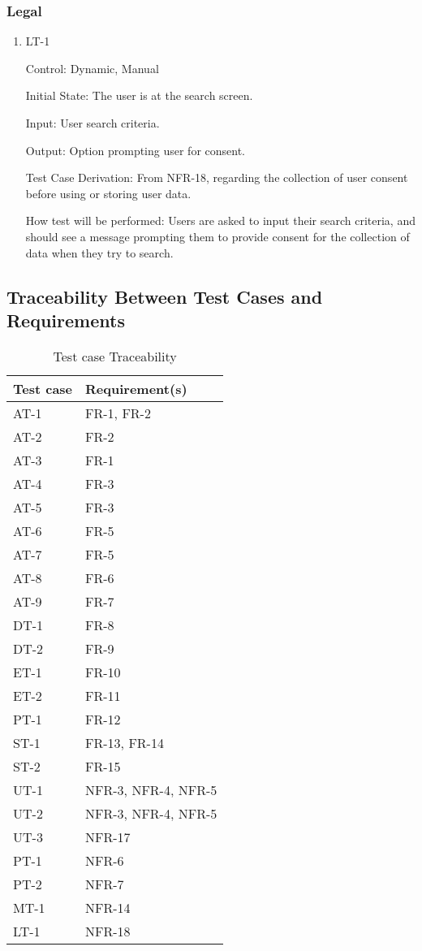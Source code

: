 \documentclass[12pt, titlepage]{article}
\begin{document}
\subsubsection{Legal}

\begin{enumerate}
\item{LT-1}

Control: Dynamic, Manual
					
Initial State: The user is at the search screen.

Input: User search criteria.

Output: Option prompting user for consent.

Test Case Derivation: From NFR-18, regarding the collection of user consent before using or storing user data.

How test will be performed: Users are asked to input their search criteria, and should see a message prompting them to provide consent for the collection of data when they try to search.

\end{enumerate}

\subsection{Traceability Between Test Cases and Requirements}

\begin{table}[H]
  \caption{Test case Traceability}
  \begin{tabular}{|p{7cm}|p{7cm}|}
  \hline
  Test case & Requirement(s)\\
  \hline
  AT-1 & FR-1, FR-2\\
  \hline
  AT-2 & FR-2\\
  \hline
  AT-3 & FR-1\\
  \hline
  AT-4 & FR-3\\
  \hline
  AT-5 & FR-3\\
  \hline
  AT-6 & FR-5\\
  \hline
  AT-7 & FR-5\\
  \hline
  AT-8 & FR-6\\
  \hline
  AT-9 & FR-7\\
  \hline
  DT-1 & FR-8\\
  \hline
  DT-2 & FR-9\\
  \hline
  ET-1 & FR-10\\
  \hline
  ET-2 & FR-11\\
  \hline
  PT-1 & FR-12\\
  \hline
  ST-1 & FR-13, FR-14\\
  \hline
  ST-2 & FR-15\\
  \hline
  UT-1 & NFR-3, NFR-4, NFR-5\\
  \hline
  UT-2 & NFR-3, NFR-4, NFR-5\\
  \hline
  UT-3 & NFR-17\\
  \hline
  PT-1 & NFR-6\\
  \hline
  PT-2 & NFR-7\\
  \hline
 MT-1 & NFR-14\\
  \hline
 LT-1 & NFR-18\\
  \hline
  \end{tabular}
\end{table}
\end{document}
